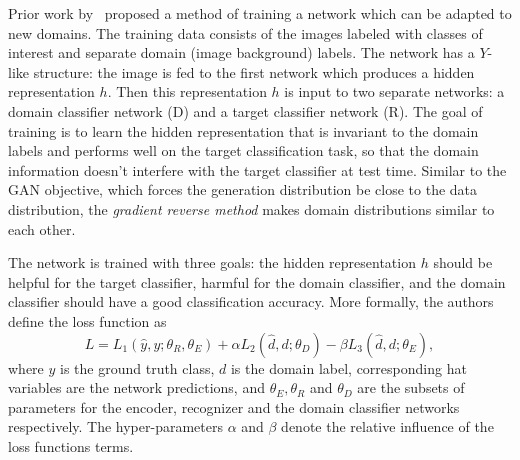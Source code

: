 \documentclass{article}
\begin{document}

    
    Prior work by~\cite{ganin2014unsupervised} proposed a method of training a network 
    which can be adapted to new domains. The training data consists of the images
    labeled with classes of interest and separate domain (image background) labels. 
    The network has a $Y$-like structure: the image is fed to the
    first network which produces a hidden representation $h$. Then this representation $h$ is input to two separate networks: a domain classifier network (D) and 
    a target classifier network (R). The goal of training is to learn the hidden 
    representation that is invariant to the domain labels and performs well on the target classification task, so that the domain information doesn't 
    interfere with the target classifier at test time. Similar to the GAN objective, which forces the generation distribution be close to the data distribution,
    the \emph{gradient reverse method} makes domain distributions similar to each other.

    The network is trained with three goals: the hidden representation $h$ should
    be helpful for the target classifier, harmful for the domain classifier,
    and the domain classifier should have a good classification accuracy. More 
    formally, the authors define the loss function as
    \begin{equation}
        L = L_1(\hat{y}, y; \theta_R, \theta_E) + 
        \alpha L_2(\hat{d}, d; \theta_D) -
        \beta L_3(\hat{d}, d; \theta_E),
        \label{eq:grm}
    \end{equation}
    where $y$ is the ground truth class, $d$ is the domain label, corresponding
    hat variables are the network predictions, and $\theta_E, \theta_R$ and $\theta_D$ are the subsets of  parameters for the encoder,
    recognizer and the domain classifier networks respectively. The hyper-parameters
    $\alpha$ and $\beta$ denote the relative influence of the loss functions terms.
\end{document}

